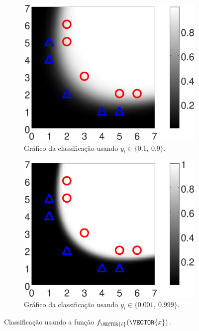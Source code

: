 \begin{figure}[!h]
    \begin{subfigure}[b]{0.45\textwidth}
        \centering
        \includegraphics[width=\textwidth]{chapters/classificacao/mfiles/reglogrnr1poly/ex1s1-reglogrnr1poly.eps}
        \caption{Gráfico da classificação usando $y_l \in \{0.1,~ 0.9\}$.}
        \label{fig:theo:reglogrnr1poly:xn:s1}
    \end{subfigure}
    \hfill
    \begin{subfigure}[b]{0.45\textwidth}
        \centering
        \includegraphics[width=\textwidth]{chapters/classificacao/mfiles/reglogrnr1poly/ex1s2-reglogrnr1poly.eps}
        \caption{Gráfico da classificação usando $y_l \in \{0.001,~ 0.999\}$.}
        \label{fig:theo:reglogrnr1poly:xn:s2}
    \end{subfigure}
    \caption{Classificação usando a função $f_{\VECTOR{\hat{c}}}(\VECTOR{x})$.}
    \label{fig:theo:reglogrnr1poly:xn}
\end{figure}


